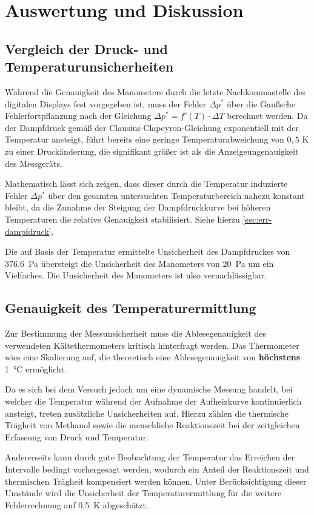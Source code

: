 \section{Auswertung und Diskussion}
\subsection{Vergleich der Druck- und Temperaturunsicherheiten}
Während die Genauigkeit des Manometers durch die letzte Nachkommastelle des digitalen Displays fest vorgegeben ist, muss der Fehler $\Delta p^{*}$ über die Gaußsche Fehlerfortpflanzung nach der Gleichung $\Delta p^{*} = f'(T) \cdot \Delta T$ berechnet werden.
Da der Dampfdruck gemäß der Clausius-Clapeyron-Gleichung exponentiell mit der Temperatur ansteigt, führt bereits eine geringe Temperaturabweichung von $0,5$ K zu einer Druckänderung, die signifikant größer ist als die Anzeigeungenauigkeit des Messgeräts.

Mathematisch lässt sich zeigen, dass dieser durch die Temperatur induzierte Fehler $\Delta p^{*}$ über den gesamten untersuchten Temperaturbereich nahezu konstant bleibt, da die Zunahme der Steigung der Dampfdruckkurve bei höheren Temperaturen die relative Genauigkeit stabilisiert. Siehe hierzu \autoref{sec:err-dampfdruck}.

Die auf Basis der Temperatur ermittelte Unsicherheit des Dampfdruckes von \qty{376.6}{\pascal} übersteigt die Unsicherheit des Manometers von \qty{20}{\pascal} um ein Vielfaches.
Die Unsicherheit des Manometers ist also vernachlässigbar.

\subsection{Genauigkeit des Temperaturermittlung}
Zur Bestimmung der Messunsicherheit muss die Ablesegenauigkeit des verwendeten Kältethermometers kritisch hinterfragt werden.
Das Thermometer wies eine Skalierung auf, die theoretisch eine Ablesegenauigkeit von \textbf{höchstens} \qty{1}{\degreeCelsius} ermöglicht.

Da es sich bei dem Versuch jedoch um eine dynamische Messung handelt, bei welcher die Temperatur während der Aufnahme der Aufheizkurve kontinuierlich ansteigt, treten zusätzliche Unsicherheiten auf.
Hierzu zählen die thermische Trägheit von Methanol sowie die menschliche Reaktionszeit bei der zeitgleichen Erfassung von Druck und Temperatur.

Andererseits kann durch gute Beobachtung der Temperatur das Erreichen der Intervalle bedingt vorhergesagt werden, wodurch ein Anteil der Reaktionszeit und thermischen Trägheit kompensiert werden können.
Unter Berücksichtigung dieser Umstände wird die Unsicherheit der Temperaturermittlung für die weitere Fehlerrechnung auf \qty{0.5}{\kelvin} abgeschätzt.

